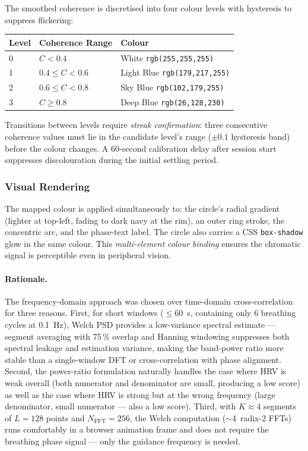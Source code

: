 \documentclass[11pt,a4paper]{article}
\begin{document}
The smoothed coherence is discretised into four colour levels with
hysteresis to suppress flickering:

\begin{center}
\begin{tabular}{lll}
\toprule
\textbf{Level} & \textbf{Coherence Range} & \textbf{Colour} \\
\midrule
0 & $C < 0.4$                  & White \quad \texttt{rgb(255,255,255)} \\
1 & $0.4 \leq C < 0.6$        & Light Blue \quad \texttt{rgb(179,217,255)} \\
2 & $0.6 \leq C < 0.8$        & Sky Blue \quad \texttt{rgb(102,179,255)} \\
3 & $C \geq 0.8$              & Deep Blue \quad \texttt{rgb(26,128,230)} \\
\bottomrule
\end{tabular}
\end{center}

Transitions between levels require \textit{streak confirmation}: three
consecutive coherence values must lie in the candidate level's range
($\pm 0.1$ hysteresis band) before the colour changes. A 60-second
calibration delay after session start suppresses discolouration during
the initial settling period.

\subsubsection{Visual Rendering}

The mapped colour is applied simultaneously to: the circle's radial
gradient (lighter at top-left, fading to dark navy at the rim), an outer
ring stroke, the concentric arc, and the phase-text label. The circle
also carries a CSS \texttt{box-shadow} glow in the same colour. This
\textit{multi-element colour binding} ensures the chromatic signal is
perceptible even in peripheral vision.

\paragraph{Rationale.}
The frequency-domain approach was chosen over time-domain cross-correlation for
three reasons. First, for short windows ($\leq 60$~s, containing only 6
breathing cycles at 0.1~Hz), Welch PSD provides a low-variance spectral
estimate — segment averaging with 75\,\% overlap and Hanning windowing
suppresses both spectral leakage and estimation variance, making the band-power
ratio more stable than a single-window DFT or cross-correlation with phase
alignment. Second, the power-ratio formulation naturally handles the case where
HRV is weak overall (both numerator and denominator are small, producing a low
score) as well as the case where HRV is strong but at the wrong frequency
(large denominator, small numerator — also a low score). Third, with $K \approx
4$ segments of $L = 128$ points and $N_{\text{FFT}} = 256$, the Welch
computation ($\sim$4~radix-2 FFTs) runs comfortably in a browser animation
frame and does not require the breathing phase signal — only the guidance
frequency is needed.
\end{document}
